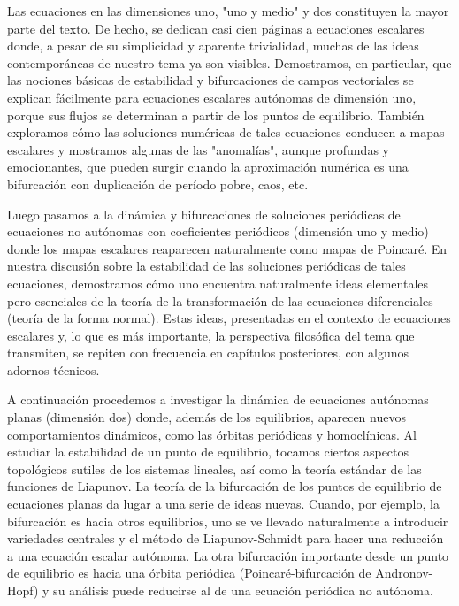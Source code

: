 \documentclass[]{article}
\begin{document}
\hfill

Las ecuaciones en las dimensiones uno, "uno y medio" y dos constituyen la mayor parte del texto. De hecho, se dedican casi cien páginas a ecuaciones escalares donde, a pesar de su simplicidad y aparente trivialidad, muchas de las ideas contemporáneas de nuestro tema ya son visibles. Demostramos, en particular, que las nociones básicas de estabilidad y bifurcaciones de campos vectoriales se explican fácilmente para ecuaciones escalares autónomas de dimensión uno, porque sus flujos se determinan a partir de los puntos de equilibrio. También exploramos cómo las soluciones numéricas de tales ecuaciones conducen a mapas escalares y mostramos algunas de las "anomalías", aunque profundas y emocionantes, que pueden surgir cuando la aproximación numérica es una bifurcación con duplicación de período pobre, caos, etc.

\hfill

Luego pasamos a la dinámica y bifurcaciones de soluciones periódicas de ecuaciones no autónomas con coeficientes periódicos (dimensión uno y medio) donde los mapas escalares reaparecen naturalmente como mapas de Poincaré. En nuestra discusión sobre la estabilidad de las soluciones periódicas de tales ecuaciones, demostramos cómo uno encuentra naturalmente ideas elementales pero esenciales de la teoría de la transformación de las ecuaciones diferenciales (teoría de la forma normal). Estas ideas, presentadas en el contexto de ecuaciones escalares y, lo que es más importante, la perspectiva filosófica del tema que transmiten, se repiten con frecuencia en capítulos posteriores, con algunos adornos técnicos.

\hfill

A continuación procedemos a investigar la dinámica de ecuaciones autónomas planas (dimensión dos) donde, además de los equilibrios, aparecen nuevos comportamientos dinámicos, como las órbitas periódicas y homoclínicas. Al estudiar la estabilidad de un punto de equilibrio, tocamos ciertos aspectos topológicos sutiles de los sistemas lineales, así como la teoría estándar de las funciones de Liapunov. La teoría de la bifurcación de los puntos de equilibrio de ecuaciones planas da lugar a una serie de ideas nuevas. Cuando, por ejemplo, la bifurcación es hacia otros equilibrios, uno se ve llevado naturalmente a introducir variedades centrales y el método de Liapunov-Schmidt para hacer una reducción a una ecuación escalar autónoma. La otra bifurcación importante desde un punto de equilibrio es hacia una órbita periódica (Poincaré-bifurcación de Andronov-Hopf) y su análisis puede reducirse al de una ecuación periódica no autónoma.
\end{document}
